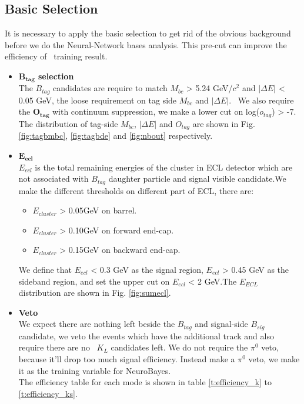 \subsection{Basic Selection}
It is necessary to apply the basic selection to get rid of the obvious background before we do the Neural-Network bases analysis. This pre-cut can improve the efficiency of \
training result.
\begin{itemize}[leftmargin=*]
\item \textbf{$\bm{B_{tag}}$ selection}\\
The $B_{tag}$ candidates are require to match $M_{bc}$ > 5.24 GeV/$c^2$ and $|\Delta E|$ < 0.05 GeV, the loose requirement on tag side $M_{bc}$ and $|\Delta E|$. \
We also require the $\bm{O_{tag}}$ with continuum suppression, we make a lower cut on log($o_{tag}$) > -7. The distribution of tag-side $M_{bc}$, $|\Delta E|$ and $O_{tag}$ are shown in Fig. \ref{fig:tagbmbc}, \ref{fig:tagbde} and \ref{fig:nbout} respectively.
\item $\bm{E_{ecl}}$\\
$E_{ecl}$ is the total remaining energies of the cluster in ECL detector which are not associated with $B_{tag}$ daughter particle and signal visible candidate.We make the different thresholds on different part of ECL, there are:
\begin{itemize}[leftmargin=*]
\item $E_{cluster}$ > 0.05GeV on barrel.
\item $E_{cluster}$ > 0.10GeV on forward end-cap.
\item $E_{cluster}$ > 0.15GeV on backward end-cap.
\end{itemize}
We define that $E_{ecl}$ < 0.3 GeV as the signal region, $E_{ecl}$ > 0.45 GeV as the sideband region, and set the upper cut on $E_{ecl}$ < 2 GeV.The $E_{ECL}$ distribution are shown in Fig. \ref{fig:sumecl}.
\item \textbf{Veto}\\
We expect there are nothing left beside the $B_{tag}$ and signal-side $B_{sig}$ candidate, we veto the events which have the additional track and also require there are no \
$K_L$ candidates left. We do not require the $\pi^0$ veto, because it'll drop too much signal efficiency. Instead make a $\pi^0$ veto, we make it as the training variable for NeuroBayes.\\
The efficiency table for each mode is shown in table \ref{t:efficiency_k} to \ref{t:efficiency_ks}.
\end{itemize}
